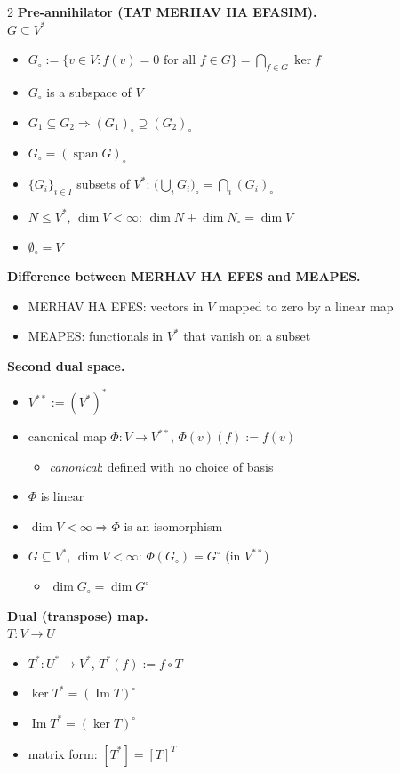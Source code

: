\documentclass[fleqn]{article}
\newcommand{\subhead}[1]{\medskip\noindent\textbf{#1}}
\begin{document}
\begin{multicols}{2}
\subhead{Pre-annihilator (TAT MERHAV HA EFASIM).}\\
$G \subseteq V^*$
\begin{itemize}
\item $G_{\circ} := \{v \in V : f(v)=0 \text{ for all } f \in G\} = \bigcap_{f \in G} \ker f$
\item $G_{\circ}$ is a subspace of $V$
\item $G_1 \subseteq G_2 \Rightarrow (G_1)_{\circ} \supseteq (G_2)_{\circ}$
\item $G_{\circ} = (\operatorname{span} G)_{\circ}$
\item $\{G_i\}_{i \in I}$ subsets of $V^*$: $\big(\bigcup_i G_i\big)_{\circ} = \bigcap_i (G_i)_{\circ}$
\item $N \le V^*$, $\dim V<\infty$: $\dim N + \dim N_{\circ} = \dim V$
\item $\emptyset_{\circ} = V$
\end{itemize}

\subhead{Difference between MERHAV HA EFES and MEAPES.}
\begin{itemize}
\item MERHAV HA EFES: vectors in $V$ mapped to zero by a linear map
\item MEAPES: functionals in $V^*$ that vanish on a subset
\end{itemize}

\subhead{Second dual space.}
\begin{itemize}
\item $V^{**} := (V^*)^*$
\item canonical map $\Phi:V \to V^{**}$, $\Phi(v)(f) := f(v)$
\begin{itemize}
\item \emph{canonical}: defined with no choice of basis
\end{itemize}
\item $\Phi$ is linear
\item $\dim V<\infty \Rightarrow \Phi$ is an isomorphism
\item $G \subseteq V^*$, $\dim V<\infty$: $\Phi(G_{\circ}) = G^{\circ}$ (in $V^{**}$)
\begin{itemize}
\item $\dim G_{\circ} = \dim G^{\circ}$
\end{itemize}
\end{itemize}

{\color{red}
\subhead{Dual (transpose) map.}\\
$T:V \to U$
\begin{itemize}
\item $T^*:U^* \to V^*$, $T^*(f) := f \circ T$
\item $\ker T^* = (\operatorname{Im}T)^{\circ}$
\item $\operatorname{Im}T^* = (\ker T)^{\circ}$
\item matrix form: $[T^*] = [T]^T$
\end{itemize}
}


\end{multicols}
\end{document}
